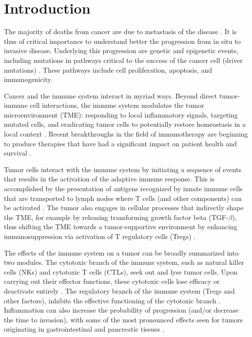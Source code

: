 \documentclass[11pt]{article}
\begin{document}
\section{Introduction}
The majority of deaths from cancer are due to metastasis of the disease \cite{dillekaas201990}. It is thus of critical importance to understand better the progression from in situ to invasive disease. Underlying this progression are genetic and epigenetic events, including mutations in pathways critical to the success of the cancer cell (driver mutations) \cite{ryan2016hallmarks}. These pathways include cell proliferation, apoptosis, and immunogenicity.
\par 
Cancer and the immune system interact in myriad ways. Beyond direct tumor-immune cell interactions, the immune system modulates the tumor microenvironment (TME): responding to local inflammatory signals, targeting mutated cells, and eradicating tumor cells to potentially restore homeostasis in a local context \cite{de2006paradoxical}.
Recent breakthroughs in the field of immunotherapy are beginning to produce therapies that have had a significant impact on patient health and survival \cite{pardoll2012blockade,restifo2012adoptive}.
\par 
Tumor cells interact with the immune system by initiating a sequence of events that results in the activation of the adaptive immune response. This is accomplished by the presentation of antigens recognized by innate immune cells that are transported to lymph nodes where T cells (and other components) can be activated \cite{schreiber11_cancer}. The tumor also engages in cellular processes that indirectly shape the TME, for example by releasing transforming growth factor beta (TGF-$\beta$), thus shifting the TME towards a tumor-supportive environment by enhancing immunosuppression via activation of T regulatory cells (Tregs) \cite{schreiber11_cancer}.
\par
The effects of the immune system on a tumor can be broadly summarized into two modules. The cytotoxic branch of the immune system, such as natural killer cells (NKs) and cytotoxic T cells (CTLs), seek out and lyse tumor cells.
Upon carrying out their effector functions, these cytotoxic cells lose efficacy or deactivate entirely \cite{finn12_immunooncology-1}.
The regulatory branch of the immune system (Tregs and other factors), inhibits the effective functioning of the cytotoxic branch \cite{ruffell2010lymphocytes}.
Inflammation can also increase the probability of progression (and/or decrease the time to invasion), with some of the most pronounced effects seen for tumors originating in gastrointestinal and pancreatic tissues \cite{hu10_inflammationinduced, balkwill01_inflammation}.
\end{document}
